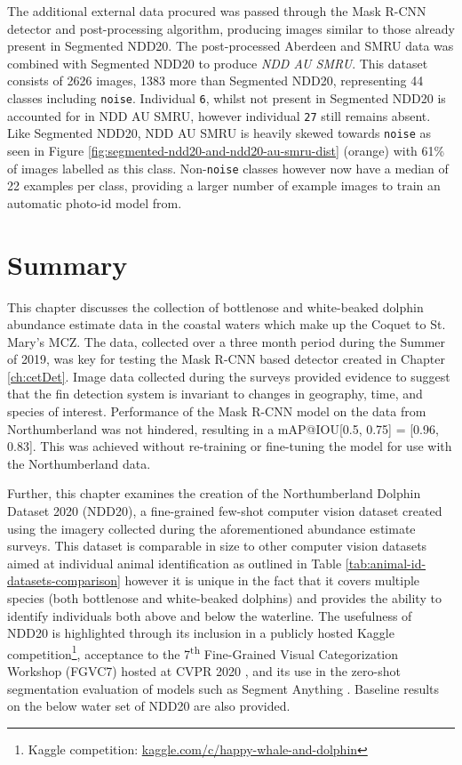 The additional external data procured was passed through the Mask R-CNN detector and post-processing algorithm, producing images similar to those already present in Segmented NDD20. The post-processed Aberdeen and SMRU data was combined with Segmented NDD20 to produce \textit{NDD AU SMRU}. This dataset consists of 2626 images, 1383 more than Segmented NDD20, representing 44 classes including \texttt{noise}. Individual \texttt{6}, whilst not present in Segmented NDD20 is accounted for in NDD AU SMRU, however individual \texttt{27} still remains absent. Like Segmented NDD20, NDD AU SMRU is heavily skewed towards \texttt{noise} as seen in Figure \ref{fig:segmented-ndd20-and-ndd20-au-smru-dist} (orange) with 61\% of images labelled as this class. Non-\texttt{noise} classes however now have a median of 22 examples per class, providing a larger number of example images to train an automatic photo-id model from. 

\section{Summary}\label{ch:NDD,sec:summary}

This chapter discusses the collection of bottlenose and white-beaked dolphin abundance estimate data in the coastal waters which make up the Coquet to St. Mary's MCZ. The data, collected over a three month period during the Summer of 2019, was key for testing the Mask R-CNN based detector created in Chapter \ref{ch:cetDet}. Image data collected during the surveys provided evidence to suggest that the fin detection system is invariant to changes in geography, time, and species of interest. Performance of the Mask R-CNN model on the data from Northumberland was not hindered, resulting in a mAP@IOU[0.5, 0.75] = [0.96, 0.83]. This was achieved without re-training or fine-tuning the model for use with the Northumberland data. 

Further, this chapter examines the creation of the Northumberland Dolphin Dataset 2020 (NDD20), a fine-grained few-shot computer vision dataset created using the imagery collected during the aforementioned abundance estimate surveys. This dataset is comparable in size to other computer vision datasets aimed at individual animal identification as outlined in Table \ref{tab:animal-id-datasets-comparison} however it is unique in the fact that it covers multiple species (both bottlenose and white-beaked dolphins) and provides the ability to identify individuals both above and below the waterline. The usefulness of NDD20 is highlighted through its inclusion in a publicly hosted Kaggle competition\footnote{Kaggle competition: \href{https://www.kaggle.com/c/happy-whale-and-dolphin/}{kaggle.com/c/happy-whale-and-dolphin}}, acceptance to the 7\textsuperscript{th} Fine-Grained Visual Categorization Workshop (FGVC7) hosted at CVPR 2020 \cite{trotter_ndd20_2020}, and its use in the zero-shot segmentation evaluation of models such as Segment Anything \cite{kirillov_segment_2023}. Baseline results on the below water set of NDD20 are also provided. 

